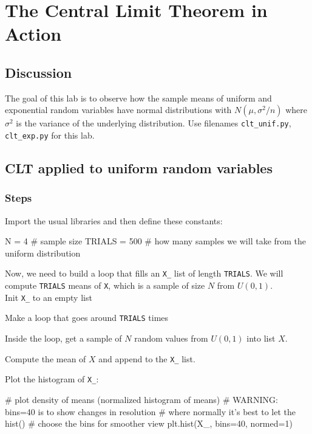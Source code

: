 \chapter{The Central Limit Theorem in Action}

\setcounter{problem}{1}

\section{Discussion}

\begin{fullwidth}

The goal of this lab is to observe how the sample means of uniform and exponential random variables have normal distributions with $N(\mu, \sigma^2/n)$ where $\sigma^2$ is the variance of the underlying distribution. Use filenames {\tt clt\_unif.py}, {\tt clt\_exp.py} for this lab.

\section{CLT applied to uniform random variables}

\subsection{Steps}

\step Import the usual libraries and then define these constants:

\begin{pyverbatim}
N = 4  # sample size
TRIALS = 500 # how many samples we will take from the uniform distribution
\end{pyverbatim}

Now, we need to build a loop that fills an {\tt X\_} list of length {\tt TRIALS}.  We will compute {\tt TRIALS} means of {\tt X}, which is a sample of size $N$ from $U(0,1)$. \\

\step Init {\tt X\_} to an empty list

\step Make a loop that goes around {\tt TRIALS} times

\step Inside the loop, get a sample of $N$ random values from $U(0,1)$ into list $X$.

\step Compute the mean of $X$ and append to the {\tt X\_} list.

\step Plot the histogram of {\tt X\_}:

\begin{pyverbatim}
# plot density of means (normalized histogram of means)
# WARNING: bins=40 is to show changes in resolution
#          where normally it's best to let the hist()
#          choose the bins for smoother view
plt.hist(X_, bins=40, normed=1)
\end{pyverbatim}


\end{fullwidth}

